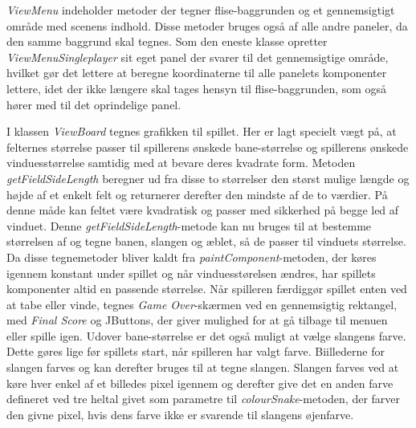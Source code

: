 \documentclass{report}
\begin{document}
\textit{ViewMenu} indeholder metoder der tegner flise-baggrunden og et gennemsigtigt område med scenens indhold. Disse metoder bruges også af alle andre paneler, da den samme baggrund skal tegnes. Som den eneste klasse opretter \textit{ViewMenuSingleplayer} sit eget panel der svarer til det gennemsigtige område, hvilket gør det lettere at beregne koordinaterne til alle panelets komponenter lettere, idet der ikke længere skal tages hensyn til flise-baggrunden, som også hører med til det oprindelige panel.

I klassen \textit{ViewBoard} tegnes grafikken til spillet. Her er lagt specielt vægt på, at felternes størrelse passer til spillerens ønskede bane-størrelse og spillerens ønskede vinduesstørrelse samtidig med at bevare deres kvadrate form. Metoden \textit{getFieldSideLength} beregner ud fra disse to størrelser den størst mulige længde og højde af et enkelt felt og returnerer derefter den mindste af de to værdier. På denne måde kan feltet være kvadratisk og passer med sikkerhed på begge led af vinduet. Denne \textit{getFieldSideLength}-metode kan nu bruges til at bestemme størrelsen af og tegne banen, slangen og æblet, så de passer til vinduets størrelse. Da disse tegnemetoder bliver kaldt fra \textit{paintComponent}-metoden, der køres igennem konstant under spillet og når vinduesstørelsen ændres, har spillets komponenter altid en passende størrelse.
Når spilleren færdiggør spillet enten ved at tabe eller vinde, tegnes \textit{Game Over}-skærmen ved en gennemsigtig rektangel, med \textit{Final Score} og JButtons, der giver mulighed for at gå tilbage til menuen eller spille igen.
Udover bane-størrelse er det også muligt at vælge slangens farve. Dette gøres lige før spillets start, når spilleren har valgt farve. Biillederne for slangen farves og kan derefter bruges til at tegne slangen. Slangen farves ved at køre hver enkel af et billedes pixel igennem og derefter give det en anden farve defineret ved tre heltal givet som parametre til \textit{colourSnake}-metoden, der farver den givne pixel, hvis dens farve ikke er svarende til slangens øjenfarve.
\end{document}
